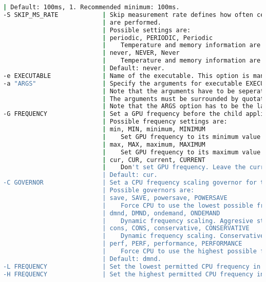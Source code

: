 \begin{landscape}
\begin{lstlisting}[language=sh,stringstyle=\color{black},keywordstyle=\color{black}]
                           | Default: 100ms, 1. Recommended minimum: 100ms.
-S SKIP_MS_RATE            | Skip measurement rate defines how often certain measurements
                           | are performed.
                           | Possible settings are:
                           | periodic, PERIODIC, Periodic
                           |    Temperature and memory information are measured only at every 10th measuring point.
                           | never, NEVER, Never
                           |    Temperature and memory information are measured at every measuring point.
                           | Default: never.
-e EXECUTABLE              | Name of the executable. This option is mandatory.
-a "ARGS"                  | Specify the arguments for executable EXECUTABLE with this option.
                           | Note that the arguments have to be seperated by spaces.
                           | The arguments must be surrounded by quotation marks!
                           | Note that the ARGS option has to be the last in the argument list!
-G FREQUENCY               | Set a GPU frequency before the child application get started.
                           | Possible frequency settings are:
                           | min, MIN, minimum, MINIMUM
                           |    Set GPU frequency to its minimum value.
                           | max, MAX, maximum, MAXIMUM
                           |    Set GPU frequency to its maximum value.
                           | cur, CUR, current, CURRENT
                           |    Don't set GPU frequency. Leave the current setting untouched.
                           | Default: cur.
-C GOVERNOR                | Set a CPU frequency scaling governor for the 'acpi-cpufreq' driver.
                           | Possible governors are:
                           | save, SAVE, powersave, POWERSAVE
                           |    Force CPU to use the lowest possible frequency.
                           | dmnd, DMND, ondemand, ONDEMAND
                           |    Dynamic frequency scaling. Aggresive strategy.
                           | cons, CONS, conservative, CONSERVATIVE
                           |    Dynamic frequency scaling. Conservative strategy.
                           | perf, PERF, performance, PERFORMANCE
                           |    Force CPU to use the highest possible frequency.
                           | Default: dmnd.
-L FREQUENCY               | Set the lowest permitted CPU frequency in MHz.
-H FREQUENCY               | Set the highest permitted CPU frequency in MHz.

\end{lstlisting}
\end{landscape}
